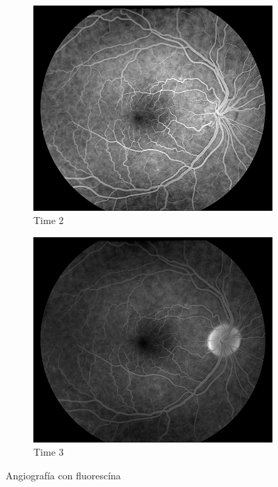 \begin{figure}[H]
\begin{subfigure}[b]{0.23\textwidth}
    \end{subfigure}
	\begin{subfigure}[b]{0.23\textwidth}
        \includegraphics[width=1\textwidth]{./Figures/FA_Fig3.jpg}
        \caption{Time 2}
        \label{fig:af3}
    \end{subfigure}
    	\begin{subfigure}[b]{0.23\textwidth}
        \includegraphics[width=1\textwidth]{./Figures/FA_Fig4.jpg}
        \caption{Time 3}
        \label{fig:af4}
    \end{subfigure}
	\label{fig:retina}
	\caption{Angiograf\'ia con fluoresc\'ina}
\end{figure}


